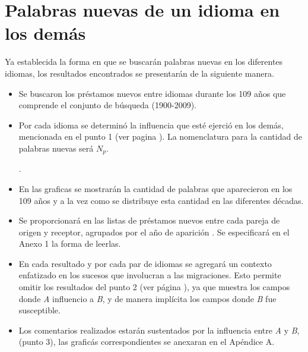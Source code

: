 {%
\section{Palabras nuevas de un idioma en los demás} %
 

Ya establecida la forma en que se buscarán  palabras nuevas en los diferentes idiomas,  los resultados encontrados se presentarán de la siguiente manera.

\begin{itemize}

\item Se buscaron los préstamos nuevos entre idiomas durante los 109 años que comprende el conjunto de búsqueda (1900-2009).
	
\item Por cada idioma se determinó la influencia que esté ejerció en los demás, mencionada en el punto 1 (ver pagina \pageref{proceso.nuevos}). La nomenclatura para la cantidad de palabras nuevas será $N_{p}$.

. 


\item En las graficas se mostrarán la cantidad de palabras que aparecieron en los 109 años y a la vez como se distribuye esta cantidad en las diferentes décadas. 

\item Se proporcionará en \cite{prestamos_nuevos} las listas  de préstamos nuevos entre cada pareja de origen y receptor, agrupados por el año de aparición .  Se especificará en el Anexo 1  la forma de leerlas.

\item En cada resultado y por cada par de idiomas se agregará un contexto enfatizado en los sucesos  que involucran a las migraciones. Esto permite omitir los resultados del punto 2 (ver  página \pageref{proceso.nuevos}), ya que muestra los campos donde \textit{A} influencio a  \textit{B}, y  de manera implícita los campos donde \textit{B} fue susceptible.

\item Los comentarios realizados estarán sustentados por la influencia entre \textit{A} y \textit{B}, (punto 3), las graficás correspondientes se anexaran en el Apéndice A.


\end{itemize}}
